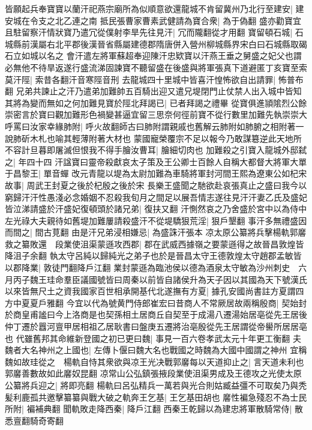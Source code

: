 皆願起兵奉寶寶以蘭汗祀燕宗廟所為似順意欲還龍城不肯留冀州乃北行至建安|{
	建安城在令支之北乙連之南}
抵民張曹家曹素武健請為寶合衆|{
	為于偽翻}
盛亦勸寶宜且駐留察汗情狀寶乃遣冗從僕射李旱先往見汗|{
	冗而隴翻從才用翻}
寶留頓石城|{
	石城縣前漢屬右北平郡後漢晉省縣屬建德郡隋唐併入營州柳城縣界宋白曰石城縣取碣石立如城以名之}
會汗遣左將軍蘇超奉迎陳汗忠欵寶以汗燕王垂之舅盛之妃父也謂必無他不待旱返遂行盛流涕固諫寶不聽留盛在後盛與將軍張真下道避匿丁亥寶至索莫汗陘|{
	索昔各翻汗音寒陘音刑}
去龍城四十里城中皆喜汗惶怖欲自出請罪|{
	怖普布翻}
兄弟共諫止之汗乃遣弟加難帥五百騎出迎又遣兄堤閉門止仗禁人出入城中皆知其將為變而無如之何加難見寶於陘北拜謁已|{
	已者拜謁之禮畢}
從寶俱進頴隂烈公餘崇密言於寶曰觀加難形色禍變甚逼宜留三思奈何徑前寶不從行數里加難先執崇崇大呼罵曰汝家幸緣肺附|{
	呼火故翻師古曰肺附謂親戚也舊解云肺附如肺腑之相附著一說肺斫木札也喻其輕薄附著大材也}
蒙國寵榮覆宗不足以報今乃敢謀簒逆此天地所不容計旦暮即屠滅但恨我不得手膾汝曹耳|{
	膾細切肉也}
加難殺之引寶入龍城外邸弑之|{
	年四十四}
汗諡寶曰靈帝殺獻哀太子策及王公卿士百餘人自稱大都督大將軍大單于昌黎王|{
	單音蟬}
改元青龍以堤為太尉加難為車騎將軍封河間王熙為遼東公如杞宋故事|{
	周武王封夏之後於杞殷之後於宋}
長樂王盛聞之馳欲赴哀張真止之盛曰我今以窮歸汗汗性愚淺必念婚姻不忍殺我旬月之間足以展吾情志遂往見汗汗妻乙氏及盛妃皆泣涕請盛於汗盛妃復頓頭於諸兄弟|{
	復扶又翻}
汗惻然哀之乃舍盛於宮中以為侍中左光祿大夫親待如舊堤加難屢請殺盛汗不從堤驕狠荒淫|{
	狠戶墾翻}
事汗多無禮盛因而間之|{
	間古莧翻}
由是汗兄弟浸相嫌忌|{
	為盛誅汗張本}
凉太原公纂將兵擊楊軌郭黁救之纂敗還　段業使沮渠蒙遜攻西郡|{
	郡在武威西據嶺之要蒙遜得之故晉昌敦煌皆降沮子余翻}
執太守呂純以歸純光之弟子也於是晉昌太守王德敦煌太守趙郡孟敏皆以郡降業|{
	敦徒門翻降戶江翻}
業封蒙遜為臨池侯以德為酒泉太守敏為沙州刺史　六月丙子魏王珪命羣臣議國號皆曰周秦以前皆自諸侯升為天子因以其國為天下號漢氏以來皆無尺土之資我國家百世相承開基代北遂撫有方夏|{
	據孔安國尚書註方夏謂四方中夏夏戶雅翻}
今宜以代為號黄門侍郎崔宏曰昔商人不常厥居故兩稱殷商|{
	契始封於商皇甫謐曰今上洛商是也契孫相土居商丘自契至于成湯八遷湯始居亳從先王居後仲丁遷於囂河亶甲居相祖乙居耿書曰盤庚五遷將治亳殷從先王居謂從帝嚳所居居亳也}
代雖舊邦其命維新登國之初已更曰魏|{
	事見一百六卷孝武太元十年更工衡翻}
夫魏者大名神州之上國也|{
	左傳卜偃曰魏大名也戰國之時魏為大國中國謂之神州}
宜稱魏如故珪從之　楊軌自恃其衆欲與凉王光决戰郭黁每以天道抑止之|{
	言天道未利也郭黁善數故如此黁奴昆翻}
凉常山公弘鎮張掖段業使沮渠男成及王德攻之光使太原公纂將兵迎之|{
	將即亮翻}
楊軌曰呂弘精兵一萬若與光合則姑臧益彊不可取矣乃與秃髪利鹿孤共邀擊纂纂與戰大破之軌奔王乞基|{
	王乞基田胡也}
黁性褊急殘忍不為士民所附|{
	褊補典翻}
聞軌敗走降西秦|{
	降戶江翻}
西秦王乾歸以為建忠將軍散騎常侍|{
	散悉亶翻騎奇寄翻}
